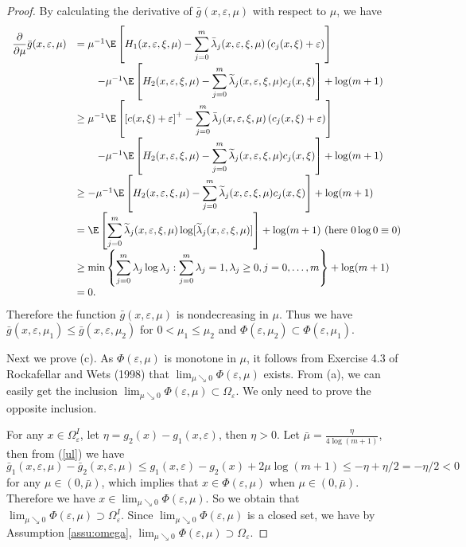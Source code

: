 \begin{proof}
By calculating the derivative of $\bar g(x,\varepsilon,\mu)$ with
respect to $\mu$, we have
\[\begin{array}{ll}
\displaystyle\frac{\partial}{\partial\mu}\bar g(x,\varepsilon,\mu)
&=\mu^{-1}\E\left[H_1(x,\varepsilon,\xi,\mu)-\displaystyle\sum_{j=0}^m\bar
\lambda_j(x,\varepsilon,\xi,\mu)\left(c_j(x,\xi)+
\varepsilon\right)\right]\\[6pt]
&\quad \quad
-\mu^{-1}\E\left[H_2(x,\varepsilon,\xi,\mu)-\displaystyle\sum_{j=0}^m\widetilde
\lambda_j(x,\varepsilon,\xi,\mu)c_j(x,\xi)\right]+\log(m+1)\\
&\geq\mu^{-1}\E\left[\left[c(x,\xi)+\varepsilon\right]^+-\displaystyle
\sum_{j=0}^m\bar \lambda_j(x,\varepsilon,\xi,\mu)\left(c_j(x,\xi)+
\varepsilon\right)\right]\\[6pt]
&\quad \quad
-\mu^{-1}\E\left[H_2(x,\varepsilon,\xi,\mu)-\displaystyle\sum_{j=0}^m\widetilde
\lambda_j(x,\varepsilon,\xi,\mu)c_j(x,\xi)\right]+\log(m+1)\\[6pt]
&\geq -\mu^{-1}\E\left[H_2(x,\varepsilon,\xi,\mu)-\displaystyle
\sum_{j=0}^m\widetilde\lambda_j(x,\varepsilon,\xi,\mu)c_j(x,\xi)\right]+\log(m+1)\\[6pt]
&=\E\left[\displaystyle \sum_{j=0}^m\widetilde
\lambda_j(x,\varepsilon,\xi,\mu)\log[\widetilde
\lambda_j(x,\varepsilon,\xi,\mu)]\right]+
\log(m+1)\mbox{ (here }0\log 0\equiv 0)\\[6pt]
&\geq \displaystyle \min \left \{\sum_{j=0}^m \lambda_j\log
\lambda_j: \sum_{j=0}^m \lambda_j=1, \lambda_j \geq 0, j=0,\ldots,
m\right \}+\log (m+1)\\[6pt]
&=0.
\end{array}\]
Therefore the function $\bar g(x,\varepsilon,\mu)$ is nondecreasing
in $\mu$. Thus we have $\bar g(x,\varepsilon,\mu_1)\leq \bar
g(x,\varepsilon,\mu_2)$ for $0<\mu_1\leq \mu_2$ and
$\Phi(\varepsilon,\mu_2)\subset \Phi(\varepsilon,\mu_1)$.

Next we prove (c). As $\Phi(\varepsilon,\mu)$ is monotone in $\mu$,
it follows from Exercise 4.3 of Rockafellar and Wets (1998) that
$\lim_{\mu\searrow 0} \Phi(\varepsilon,\mu)$ exists. From (a), we
can easily get the inclusion $\lim_{\mu\searrow 0}
\Phi(\varepsilon,\mu)\subset\Omega_\varepsilon$. We only need to
prove the opposite inclusion.

For any $x\in \Omega_\varepsilon^I$, let
$\eta=g_2(x)-g_1(x,\varepsilon)$, then $\eta>0$. Let $\bar
\mu=\displaystyle \frac{\eta}{4\log(m+1)}$, then from (\ref{ul}) we
have
\[\bar g_1(x,\varepsilon,\mu)-\bar g_2(x,\varepsilon,\mu)\leq
g_1(x,\varepsilon)-g_2(x)+2\mu\log(m+1)\leq -\eta+\eta/2=-\eta/2<0\]
for any $\mu\in (0,\bar\mu)$, which implies that
$x\in\Phi(\varepsilon,\mu)$ when $\mu\in(0,\bar\mu)$. Therefore we
have $x\in\displaystyle \lim_{\mu\searrow 0} \Phi(\varepsilon,\mu)$.
So we obtain that $\displaystyle \lim_{\mu \searrow
0}\Phi(\varepsilon,\mu)\supset\Omega_{\varepsilon}^I$. Since
$\displaystyle\lim_{\mu\searrow 0}\Phi(\varepsilon,\mu)$ is a closed
set, we have by Assumption \ref{assu:omega},
$\displaystyle\lim_{\mu\searrow
0}\Phi(\varepsilon,\mu)\supset\Omega_\varepsilon$.


\end{proof}
